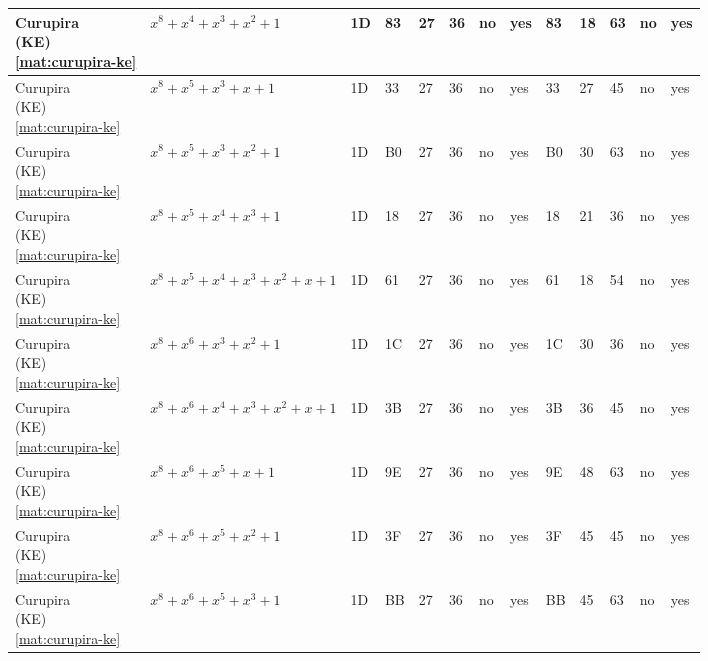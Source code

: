 \begin{tiny}
\begin{longtable}{|l|l|l|l|l|l|l|l|l|l|l|l|l|}
\shortstack{Curupira \\ (KE) \\ \eqref{mat:curupira-ke}} & $x^8 + x^4 + x^3 + x^2 + 1$ & 1D & 83 & 27 & 36 & no & yes & 83 & 18 & 63 & no & yes \\ \hline
\shortstack{Curupira \\ (KE) \\ \eqref{mat:curupira-ke}} & $x^8 + x^5 + x^3 + x + 1$ & 1D & 33 & 27 & 36 & no & yes & 33 & 27 & 45 & no & yes \\ \hline
\shortstack{Curupira \\ (KE) \\ \eqref{mat:curupira-ke}} & $x^8 + x^5 + x^3 + x^2 + 1$ & 1D & B0 & 27 & 36 & no & yes & B0 & 30 & 63 & no & yes \\ \hline
\shortstack{Curupira \\ (KE) \\ \eqref{mat:curupira-ke}} & $x^8 + x^5 + x^4 + x^3 + 1$ & 1D & 18 & 27 & 36 & no & yes & 18 & 21 & 36 & no & yes \\ \hline
\shortstack{Curupira \\ (KE) \\ \eqref{mat:curupira-ke}} & $x^8 + x^5 + x^4 + x^3 + x^2 + x + 1$ & 1D & 61 & 27 & 36 & no & yes & 61 & 18 & 54 & no & yes \\ \hline
\shortstack{Curupira \\ (KE) \\ \eqref{mat:curupira-ke}} & $x^8 + x^6 + x^3 + x^2 + 1$ & 1D & 1C & 27 & 36 & no & yes & 1C & 30 & 36 & no & yes \\ \hline
\shortstack{Curupira \\ (KE) \\ \eqref{mat:curupira-ke}} & $x^8 + x^6 + x^4 + x^3 + x^2 + x + 1$ & 1D & 3B & 27 & 36 & no & yes & 3B & 36 & 45 & no & yes \\ \hline
\shortstack{Curupira \\ (KE) \\ \eqref{mat:curupira-ke}} & $x^8 + x^6 + x^5 + x + 1$ & 1D & 9E & 27 & 36 & no & yes & 9E & 48 & 63 & no & yes \\ \hline
\shortstack{Curupira \\ (KE) \\ \eqref{mat:curupira-ke}} & $x^8 + x^6 + x^5 + x^2 + 1$ & 1D & 3F & 27 & 36 & no & yes & 3F & 45 & 45 & no & yes \\ \hline
\shortstack{Curupira \\ (KE) \\ \eqref{mat:curupira-ke}} & $x^8 + x^6 + x^5 + x^3 + 1$ & 1D & BB & 27 & 36 & no & yes & BB & 45 & 63 & no & yes \\ \hline

\end{longtable}
\end{tiny}
